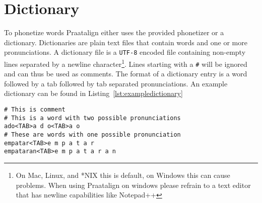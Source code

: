 
\section{Dictionary}
To phonetize words Praatalign either uses the provided phonetizer or a
dictionary. Dictionaries are plain text files that contain words and one or
more pronunciations. A dictionary file is a \texttt{UTF-8} encoded file
containing non-empty lines separated by a newline character\footnote{On Mac,
Linux, and *NIX this is default, on Windows this can cause problems. When using
Praatalign on windows please refrain to a text editor that has newline
capabilities like Notepad++}. Lines starting with a \texttt{\#} will be ignored
and can thus be used as comments. The format of a dictionary entry is a word
followed by a tab followed by tab separated pronunciations. An example
dictionary can be found in Listing~\ref{lst:exampledictionary}

\begin{lstlisting}[caption={Example dictionary},label={lst:exampledictionary}]
# This is comment
# This is a word with two possible pronunciations
ado<TAB>a d o<TAB>a o
# These are words with one possible pronunciation
empatar<TAB>e m p a t a r
empataran<TAB>e m p a t a r a n
\end{lstlisting}
	
